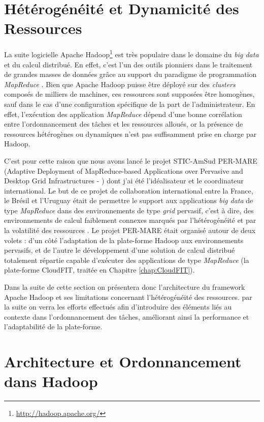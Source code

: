 \section{Hétérogénéité et Dynamicité des Ressources} \label{sec:Guilherme}

La suite logicielle Apache Hadoop\footnote{\url{http://hadoop.apache.org/}} est très populaire dans le domaine du \textit{big data} et du calcul distribué. En effet, c'est l'un des outils pionniers dans le traitement de grandes masses de données grâce au support du paradigme de programmation \textit{MapReduce} \cite{Dean2008}. Bien que Apache Hadoop puisse être déployé sur des \textit{clusters} composés de milliers de machines, ces ressources sont supposées être homogènes, sauf dans le cas d'une configuration spécifique de la part de l'administrateur. En effet, l'exécution des application \textit{MapReduce} dépend d'une bonne corrélation entre l'ordonnancement des tâches et les ressources alloués, or la présence de ressources hétérogènes ou dynamiques n'est pas suffisamment prise en charge par Hadoop. 

C'est pour cette raison que nous avons lancé le projet STIC-AmSud PER-MARE (Adaptive Deployment of MapReduce-based Applications over Pervasive and Desktop Grid Infrastructures - \cite{PER-MARE}) dont j'ai été l'idéalisateur et le coordinateur international. Le but de ce projet de collaboration international entre la France, le Brésil et l'Uruguay était de permettre le support aux applications \textit{big data} de type \textit{MapReduce} dans des environnements de type \textit{grid} pervasif, c'est à dire, des environnements de calcul faiblement connexes marqués par l'hétérogénéité et par la volatilité des ressources \cite{3PGCIC}. Le projet PER-MARE était organisé autour de deux volets : d'un côté l'adaptation de la plate-forme Hadoop aux environnements pervasifs, et de l'autre le développement d'une solution de calcul distribué totalement répartie capable d'exécuter des applications de type \textit{MapReduce} (la plate-forme CloudFIT, traitée en Chapitre \ref{chap:CloudFIT}).
 
Dans la suite de cette section on présentera donc l'architecture du framework Apache Hadoop et ses limitations concernant l'hétérogénéité des ressources. par la suite on verra les efforts effectués afin d'introduire des éléments liés au contexte dans l'ordonnancement des tâches, améliorant ainsi la performance et l'adaptabilité de la plate-forme. 



\section{Architecture et Ordonnancement dans Hadoop \label{subsec:ordoHadoop}}

